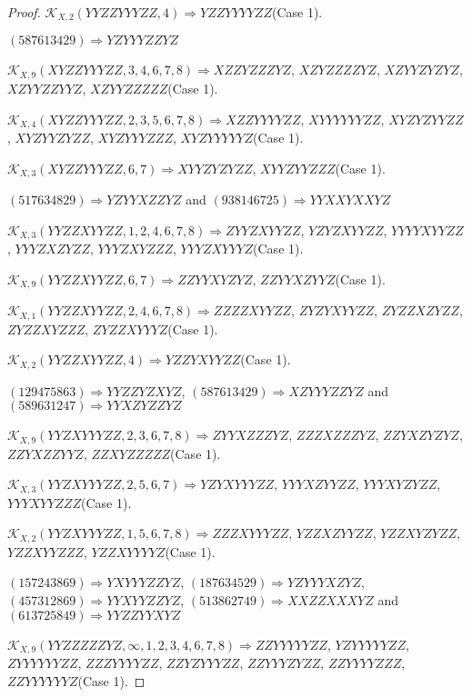 \documentclass[12pt]{article}
\theoremstyle{plain}
\theoremstyle{definition}
\theoremstyle{remark}
\newcommand{\fancy}[1]{\mathcal{#1}}
\def\K{\fancy{K}}
\begin{document}
\begin{proof}
	$\K_{X,2}(YYZZYYYZZ,4)\Rightarrow $$YZZYYYYZZ$(Case 1).
	
	
	
	$(5 8 7 6 1 3 4 2 9)\Rightarrow YZYYYZZYZ$
	
	
	$\K_{X,9}(XYZZYYYZZ,3, 4, 6, 7, 8)\Rightarrow $$XZZYZZZYZ$, $XZYZZZZYZ$, $XZYYZYZYZ$, $XZYYZZYYZ$, $XZYYZZZZZ$(Case 1).
	
	$\K_{X,4}(XYZZYYYZZ,2, 3, 5, 6, 7, 8)\Rightarrow $$XZZYYYYZZ$, $XYYYYYYZZ$, $XYZYZYYZZ$, $XYZYYZYZZ$, $XYZYYYZZZ$, $XYZYYYYYZ$(Case 1).
	
	$\K_{X,3}(XYZZYYYZZ,6, 7)\Rightarrow $$XYYZYZYZZ$, $XYYZYYZZZ$(Case 1).
	
	
	
	$(5 1 7 6 3 4 8 2 9)\Rightarrow YZYYXZZYZ$ and $(9 3 8 1 4 6 7 2 5)\Rightarrow YYXXYXXYZ$
	
	
	$\K_{X,3}(YYZZXYYZZ,1, 2, 4, 6, 7, 8)\Rightarrow $$ZYYZXYYZZ$, $YZYZXYYZZ$, $YYYYXYYZZ$, $YYYZXZYZZ$, $YYYZXYZZZ$, $YYYZXYYYZ$(Case 1).
	
	$\K_{X,9}(YYZZXYYZZ,6, 7)\Rightarrow $$ZZYYXYZYZ$, $ZZYYXZYYZ$(Case 1).
	
	$\K_{X,1}(YYZZXYYZZ,2, 4, 6, 7, 8)\Rightarrow $$ZZZZXYYZZ$, $ZYZYXYYZZ$, $ZYZZXZYZZ$, $ZYZZXYZZZ$, $ZYZZXYYYZ$(Case 1).
	
	$\K_{X,2}(YYZZXYYZZ,4)\Rightarrow $$YZZYXYYZZ$(Case 1).
	
	
	
	$(1 2 9 4 7 5 8 6 3)\Rightarrow YYZZYZXYZ$, $(5 8 7 6 1 3 4 2 9)\Rightarrow XZYYYZZYZ$ and $(5 8 9 6 3 1 2 4 7)\Rightarrow YYXZYZZYZ$
	
	
	$\K_{X,9}(YYZXYYYZZ,2, 3, 6, 7, 8)\Rightarrow $$ZYYXZZZYZ$, $ZZZXZZZYZ$, $ZZYXZYZYZ$, $ZZYXZZYYZ$, $ZZXYZZZZZ$(Case 1).
	
	$\K_{X,3}(YYZXYYYZZ,2, 5, 6, 7)\Rightarrow $$YZYXYYYZZ$, $YYYXZYYZZ$, $YYYXYZYZZ$, $YYYXYYZZZ$(Case 1).
	
	$\K_{X,2}(YYZXYYYZZ,1, 5, 6, 7, 8)\Rightarrow $$ZZZXYYYZZ$, $YZZXZYYZZ$, $YZZXYZYZZ$, $YZZXYYZZZ$, $YZZXYYYYZ$(Case 1).
	
	
	
	$(1 5 7 2 4 3 8 6 9)\Rightarrow YXYYYZZYZ$, $(1 8 7 6 3 4 5 2 9)\Rightarrow YZYYYXZYZ$, $(4 5 7 3 1 2 8 6 9)\Rightarrow YYXYYZZYZ$, $(5 1 3 8 6 2 7 4 9)\Rightarrow XXZZXXXYZ$ and $(6 1 3 7 2 5 8 4 9)\Rightarrow YYZZYYXYZ$
	
	
	$\K_{X,9}(YYZZZZZYZ,\infty,1, 2, 3, 4, 6, 7, 8)\Rightarrow $$ZZYYYYYZZ$, $YZYYYYYZZ$, $ZYYYYYYZZ$, $ZZZYYYYZZ$, $ZZYZYYYZZ$, $ZZYYYZYZZ$, $ZZYYYYZZZ$, $ZZYYYYYYZ$(Case 1).
	

\end{proof}
\end{document}
